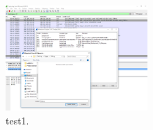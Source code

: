 \documentclass{article}
\begin{document}
\begin{figure}[H]
	\begin{center}
		\includegraphics[width=0.48\textwidth]{FILECARVING2.png}
	\end{center}
	\caption{test1.}
	\label{fig:Prd}
\end{figure}



\end{document}
